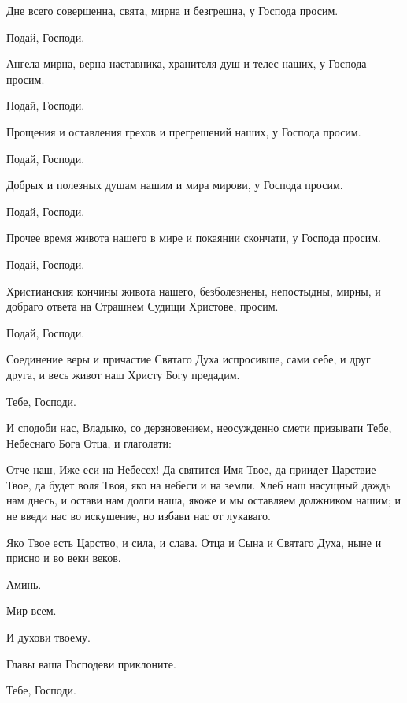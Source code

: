 \begin{mymulticols}
 Дне всего совершенна, свята, мирна и безгрешна, у Господа просим. 

 Подай, Господи.

 Ангела мирна, верна наставника, хранителя душ и телес наших, у Господа просим. 

 Подай, Господи.

 Прощения и оставления грехов и прегрешений наших, у Господа просим. 

 Подай, Господи.

 Добрых и полезных душам нашим и мира мирови, у Господа просим. 

 Подай, Господи.

 Прочее время живота нашего в мире и покаянии скончати, у Господа просим. 

 Подай, Господи.

 Христианския кончины живота нашего, безболезнены, непостыдны, мирны, и добраго ответа на Страшнем Судищи Христове, просим. 

 Подай, Господи.

 Соединение веры и причастие Святаго Духа испросивше, сами себе, и друг друга, и весь живот наш Христу Богу предадим. 

 Тебе, Господи. 

 И сподоби нас, Владыко, со дерзновением, неосужденно смети призывати Тебе, Небеснаго Бога Отца, и глаголати: 


 Отче наш, Иже еси на Небесех! Да святится Имя Твое, да приидет Царствие Твое, да будет воля Твоя, яко на небеси и на земли. Хлеб наш насущный даждь нам днесь, и остави нам долги наша, якоже и мы оставляем должником нашим; и не введи нас во искушение, но избави нас от лукаваго. 

 Яко Твое есть Царство, и сила, и слава. Отца и Сына и Святаго Духа, ныне и присно и во веки веков. 

 Аминь. 

 Мир всем. 

 И духови твоему.

 Главы ваша Господеви приклоните.

 Тебе, Господи.


\end{mymulticols}
